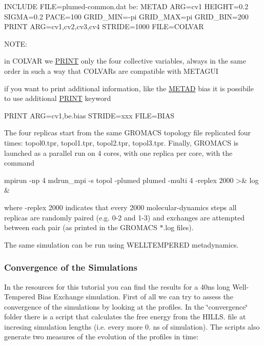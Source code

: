 \begin{DoxyVerb}INCLUDE FILE=plumed-common.dat
be: METAD ARG=cv1 HEIGHT=0.2 SIGMA=0.2 PACE=100 GRID_MIN=-pi GRID_MAX=pi GRID_BIN=200 
PRINT ARG=cv1,cv2,cv3,cv4 STRIDE=1000 FILE=COLVAR
\end{DoxyVerb}


N\+O\+T\+E\+:
\begin{DoxyEnumerate}
\item in C\+O\+L\+V\+A\+R we \hyperlink{PRINT}{P\+R\+I\+N\+T} only the four collective variables, always in the same order in such a way that C\+O\+L\+V\+A\+Rs are compatible with M\+E\+T\+A\+G\+U\+I
\item if you want to print additional information, like the \hyperlink{METAD}{M\+E\+T\+A\+D} bias it is possibile to use additional \hyperlink{PRINT}{P\+R\+I\+N\+T} keyword
\end{DoxyEnumerate}

\begin{DoxyVerb}PRINT ARG=cv1,be.bias STRIDE=xxx FILE=BIAS
\end{DoxyVerb}


The four replicas start from the same G\+R\+O\+M\+A\+C\+S topology file replicated four times\+: topol0.\+tpr, topol1.\+tpr, topol2.\+tpr, topol3.\+tpr. Finally, G\+R\+O\+M\+A\+C\+S is launched as a parallel run on 4 cores, with one replica per core, with the command

\begin{DoxyVerb}mpirun -np 4 mdrun_mpi -s topol -plumed plumed -multi 4 -replex 2000 >& log &
\end{DoxyVerb}


where -\/replex 2000 indicates that every 2000 molecular-\/dynamics steps all replicas are randomly paired (e.\+g. 0-\/2 and 1-\/3) and exchanges are attempted between each pair (as printed in the G\+R\+O\+M\+A\+C\+S $\ast$.log files).

The same simulation can be run using W\+E\+L\+L\+T\+E\+M\+P\+E\+R\+E\+D metadynamics.\hypertarget{belfast-8_bxcon}{}\subsubsection{Convergence of the Simulations}\label{belfast-8_bxcon}
In the resources for this tutorial you can find the results for a 40ns long Well-\/\+Tempered Bias Exchange simulation. First of all we can try to assess the convergence of the simulations by looking at the profiles. In the \char`\"{}convergence\char`\"{} folder there is a script that calculates the free energy from the H\+I\+L\+L\+S. file at incresing simulation lengths (i.\+e. every more 0. ns of simulation). The scripts also generate two measures of the evolution of the profiles in time\+:


